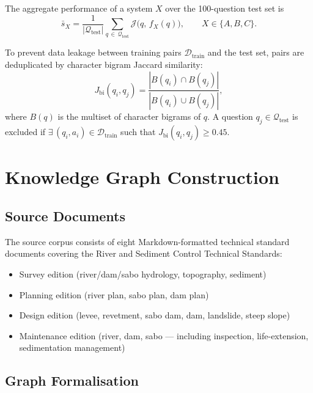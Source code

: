 \documentclass[twocolumn]{article}
\begin{document}
The aggregate performance of a system $X$ over the 100-question test set is
\begin{equation}
  \bar{s}_X = \frac{1}{|\mathcal{Q}_{\mathrm{test}}|}
               \sum_{q\,\in\,\mathcal{Q}_{\mathrm{test}}} \mathcal{J}\bigl(q,\, f_X(q)\bigr),
  \qquad X \in \{A, B, C\}.
  \label{eq:avg_score}
\end{equation}

To prevent data leakage between training pairs $\mathcal{D}_{\mathrm{train}}$ and the test set,
pairs are deduplicated by character bigram Jaccard similarity:
\begin{equation}
  J_{\mathrm{bi}}(q_i, q_j)
  = \frac{|B(q_i)\cap B(q_j)|}{|B(q_i)\cup B(q_j)|},
  \label{eq:jaccard}
\end{equation}
where $B(q)$ is the multiset of character bigrams of $q$.
A question $q_j \in \mathcal{Q}_{\mathrm{test}}$ is excluded if
$\exists\,(q_i, a_i) \in \mathcal{D}_{\mathrm{train}}$ such that $J_{\mathrm{bi}}(q_i, q_j) \geq 0.45$.

\section{Knowledge Graph Construction}
\label{sec:graph}

\subsection{Source Documents}

The source corpus consists of eight Markdown-formatted technical standard documents
covering the River and Sediment Control Technical Standards:

\begin{itemize}
  \item Survey edition (river/dam/sabo hydrology, topography, sediment)
  \item Planning edition (river plan, sabo plan, dam plan)
  \item Design edition (levee, revetment, sabo dam, dam, landslide, steep slope)
  \item Maintenance edition (river, dam, sabo --- including inspection, life-extension,
        sedimentation management)
\end{itemize}

\subsection{Graph Formalisation}
\end{document}

